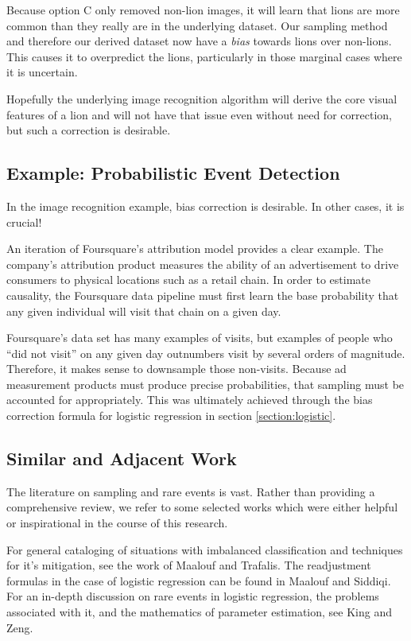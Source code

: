 \documentclass[twoside]{article}
\begin{document}
Because option C only removed non-lion images, it will learn that lions are more common than they really are in the underlying dataset. Our sampling method and therefore our derived dataset now have a \textit{bias} towards lions over non-lions. This causes it to overpredict the lions, particularly in those marginal cases where it is uncertain.

Hopefully the underlying image recognition algorithm will derive the core visual features of a lion and will not have that issue even without need for correction, but such a correction is desirable.

\subsection{Example: Probabilistic Event Detection}
\label{section:visit}

In the image recognition example, bias correction is desirable. In other cases, it is crucial!

An iteration of Foursquare’s attribution model\cite{visitprediction} provides a clear example. The company's attribution product measures the ability of an advertisement to drive consumers to physical locations such as a retail chain. In order to estimate causality, the Foursquare data pipeline must first learn the base probability that any given individual will visit that chain on a given day.

Foursquare's data set has many examples of visits, but examples of people who “did not visit” on any given day outnumbers visit by several orders of magnitude. Therefore, it makes sense to downsample those non-visits. Because ad measurement products must produce precise probabilities, that sampling must be accounted for appropriately. This was ultimately achieved through the bias correction formula for logistic regression in section \ref{section:logistic}.

\subsection{Similar and Adjacent Work}

The literature on sampling and rare events is vast. Rather than providing a comprehensive review, we refer to some selected works which were either helpful or inspirational in the course of this research.

For general cataloging of situations with imbalanced classification and techniques for it's mitigation, see the work of Maalouf and Trafalis\cite{rareevents}. The readjustment formulas in the case of logistic regression can be found in Maalouf and Siddiqi\cite{weightedlogistic}. For an in-depth discussion on rare events in logistic regression, the problems associated with it, and the mathematics of parameter estimation, see King and Zeng\cite{king}.
\end{document}
